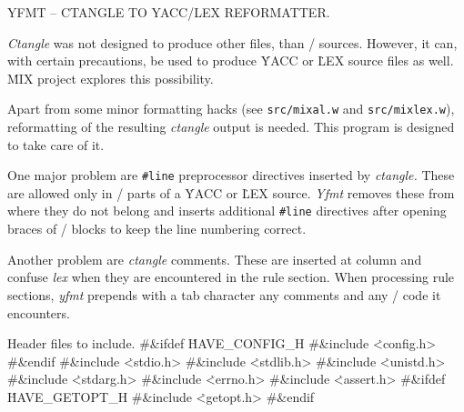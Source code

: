 
%
%
%


YFMT -- CTANGLE TO YACC/LEX REFORMATTER.

{\sl Ctangle\/} was not designed to produce other files, than \CEE/ sources.
However, it can, with certain precautions, be used to produce \.{YACC} or
\.{LEX} source files as well. \.{MIX} project explores this
possibility.

Apart from some minor formatting hacks (see {\tt src/mixal.w} and
{\tt src/mixlex.w}), reformatting of the resulting {\sl ctangle\/} output is
needed. This program is designed to take care of it.

One major problem are {\tt \#line} preprocessor directives inserted by
{\sl ctangle.} These are allowed only in \CEE/ parts of a \.{YACC} or
\.{LEX} source. {\sl Yfmt\/} removes these from where they do not
belong and inserts additional {\tt \#line} directives after opening
braces of \CEE/ blocks to keep the line numbering correct.

Another problem are {\sl ctangle\/} comments. These are inserted at
column  and confuse {\sl lex} when they are encountered in the
rule section. When processing rule sections, {\sl yfmt\/} prepends
with a tab character any comments and any \CEE/ code it encounters.

\def\ysep/{{\tt \%\%}}
\def\ylbrace/{{\tt \%$\{$}}
\def\yrbrace/{{\tt \%$\}$}}

\Y\fi

Header files to include.
\Y\B\8\#\&{ifdef} \.{HAVE\_CONFIG\_H}\6
\8\#\&{include} \.{<config.h>}\6
\8\#\&{endif}\6
\8\#\&{include} \.{<stdio.h>}\6
\8\#\&{include} \.{<stdlib.h>}\6
\8\#\&{include} \.{<unistd.h>}\6
\8\#\&{include} \.{<stdarg.h>}\6
\8\#\&{include} \.{<errno.h>}\6
\8\#\&{include} \.{<assert.h>}\6
\8\#\&{ifdef} \.{HAVE\_GETOPT\_H}\6
\8\#\&{include} \.{<getopt.h>}\6
\8\#\&{endif}\par
\fi

